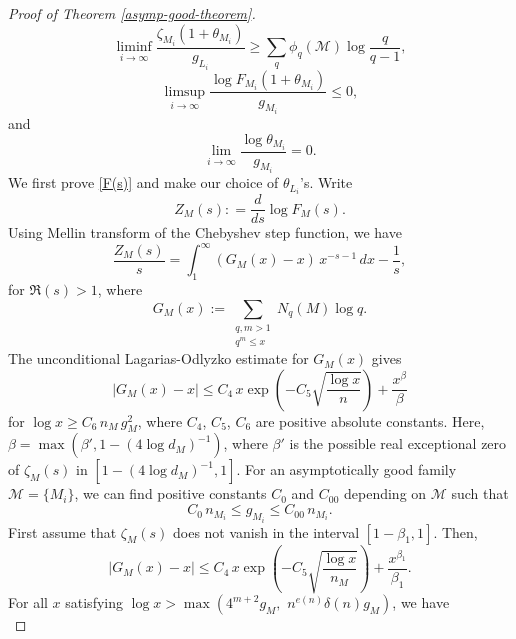 \documentclass[12pt]{amsart}
\theoremstyle{definition}
\newcommand{\rM}{\mathcal{M}}
\begin{document}
\begin{proof}[Proof of Theorem \ref{asymp-good-theorem}]
\begin{equation}\label{zeta}
\liminf_{i\to \infty} \frac{\zeta_{M_i}(1+\theta_{M_i})}{g_{L_i}} \geq \sum_q \phi_q(\rM) \log \frac{q}{q-1},
\end{equation}
\begin{equation}\label{F(s)}
\limsup_{i\to\infty} \frac{\log F_{M_i}(1+ \theta_{M_i})}{g_{M_i}} \leq 0,
\end{equation}
and
\begin{equation}\label{theta}
\lim_{i\to\infty} \frac{\log \theta_{M_i}}{g_{M_i}} = 0.
\end{equation}
We first prove \eqref{F(s)} and make our choice of $\theta_{L_i}$'s. Write
\begin{equation*}
    Z_M(s) : = \frac{d}{ds} \log F_M(s).
\end{equation*}
Using Mellin transform of the Chebyshev step function, we have
\begin{equation}\label{L-O}
\frac{Z_M(s)}{s} =  \int_{1}^{\infty} (G_M(x) - x) \, x^{-s-1} \, dx - \frac{1}{s},
\end{equation}
for $\Re(s) > 1$, where
\begin{equation*}
G_M(x) := \sum_{\substack{q,m>1 \\ q^m \leq x}} N_q(M) \log q.
\end{equation*}
The unconditional Lagarias-Odlyzko \cite{Lag} estimate for $G_M(x)$ gives
\begin{equation*}
|G_M(x) - x| \leq C_4 \, x \exp \left( -C_5 \sqrt{\frac{\log x}{n}}\right) + \frac{x^\beta}{\beta}
\end{equation*}
for $\log x \geq C_6 \, n_M \, g_M^2$, where $C_4$, $C_5$, $C_6$ are positive absolute constants. Here, $\beta = \max(\beta', 1- (4\log d_M)^{-1})$, where $\beta'$ is the possible real exceptional zero of $\zeta_M(s)$ in $[1- (4\log d_M)^{-1},1 ]$.
For an asymptotically good family $\rM=\{M_i\}$, we can find positive constants $C_0$ and $C_{00}$ depending on $\rM$ such that
\begin{equation*}
C_0 \, n_{M_i} \leq g_{M_i }\leq C_{00} \, n_{M_i}.
\end{equation*}
First assume that $\zeta_M(s)$ does not vanish in the interval $[1-\beta_1, 1]$. Then,
\begin{equation*}
|G_M(x) - x| \leq C_4 \, x \exp \left( -C_5 \sqrt{\frac{\log x}{n_M}}\right) + \frac{x^{\beta_1}}{\beta_1}.
\end{equation*}
For all $x$ satisfying $\log x > \max( 4^{m+2} g_M,\,\, n^{e(n)} \delta(n) g_M)$, we have
\begin{equation*}

\end{equation*}
\end{proof}
\end{document}
